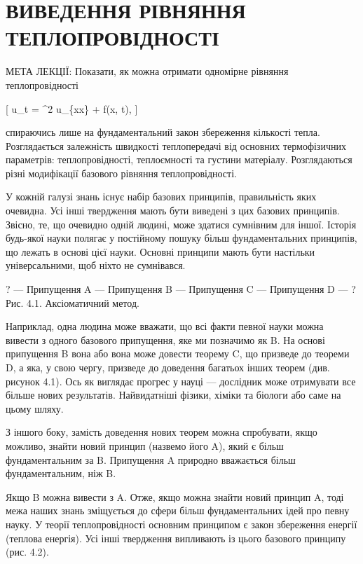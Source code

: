 \documentclass[
  ukrainian,
]{article}
\begin{document}
\section{ВИВЕДЕННЯ РІВНЯННЯ
ТЕПЛОПРОВІДНОСТІ}\label{ux432ux438ux432ux435ux434ux435ux43dux43dux44f-ux440ux456ux432ux43dux44fux43dux43dux44f-ux442ux435ux43fux43bux43eux43fux440ux43eux432ux456ux434ux43dux43eux441ux442ux456}

МЕТА ЛЕКЦІЇ: Показати, як можна отримати одномірне рівняння
теплопровідності

{[} u\_t = \alpha\^{}2 u\_\{xx\} + f(x, t), {]}

спираючись лише на фундаментальний закон збереження кількості тепла.
Розглядається залежність швидкості теплопередачі від основних
термофізичних параметрів: теплопровідності, теплоємності та густини
матеріалу. Розглядаються різні модифікації базового рівняння
теплопровідності.

У кожній галузі знань існує набір базових принципів, правильність яких
очевидна. Усі інші твердження мають бути виведені з цих базових
принципів. Звісно, те, що очевидно одній людині, може здатися сумнівним
для іншої. Історія будь-якої науки полягає у постійному пошуку більш
фундаментальних принципів, що лежать в основі цієї науки. Основні
принципи мають бути настільки універсальними, щоб ніхто не сумнівався.

? --- Припущення A --- Припущення B --- Припущення C --- Припущення D
--- ? Рис. 4.1. Аксіоматичний метод.

Наприклад, одна людина може вважати, що всі факти певної науки можна
вивести з одного базового припущення, яке ми позначимо як B. На основі
припущення B вона або вона може довести теорему C, що призведе до
теореми D, а яка, у свою чергу, призведе до доведення багатьох інших
теорем (див. рисунок 4.1). Ось як виглядає прогрес у науці --- дослідник
може отримувати все більше нових результатів. Найвидатніші фізики,
хіміки та біологи або саме на цьому шляху.

З іншого боку, замість доведення нових теорем можна спробувати, якщо
можливо, знайти новий принцип (назвемо його A), який є більш
фундаментальним за B. Припущення A природно вважається більш
фундаментальним, ніж B.

Якщо B можна вивести з A. Отже, якщо можна знайти новий принцип A, тоді
межа наших знань зміщується до сфери більш фундаментальних ідей про
певну науку. У теорії теплопровідності основним принципом є закон
збереження енергії (теплова енергія). Усі інші твердження випливають із
цього базового принципу (рис. 4.2).
\end{document}
